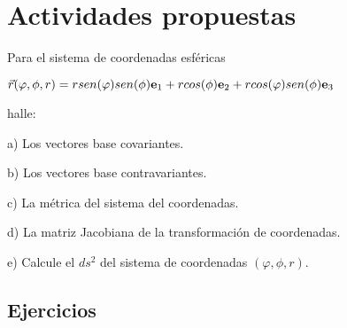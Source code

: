 \begin{figure}
\begin{center}
\end{center}
\end{figure}
\section{Actividades propuestas}
\begin{answers}
Para el sistema de coordenadas esféricas 

\bigskip
 
 $\vec{r}(\varphi,\phi,r)=r sen(\varphi)sen(\phi)\bold{e}_1+rcos(\phi)\bold{e}_2+rcos(\varphi)sen(\phi)\bold{e}_3$
 
  halle:
  
  \bigskip
  
 \noindent a) Los vectores base covariantes.
 
 \bigskip
 
  b)  Los vectores base contravariantes.
  
  \bigskip
  
  c) La métrica del sistema del coordenadas.

  \bigskip
  
  d) La matriz Jacobiana de la transformación  de coordenadas.
  
  \bigskip
  
  e) Calcule el $ds^{2}$  del sistema de coordenadas  $(\varphi,\phi,r)$. 
\end{answers}

\subsection{Ejercicios}

\bigskip


